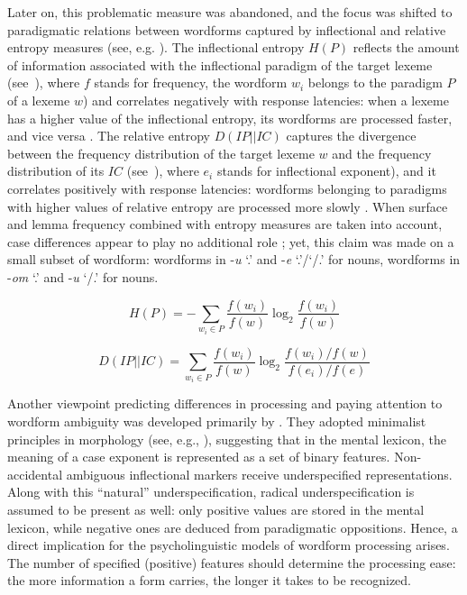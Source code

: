 \documentclass[output=paper, modfonts,newtxmath,hidelinks]{langscibook}
\begin{document}
Later on, this problematic measure was abandoned, and the focus was shifted to paradigmatic relations between wordforms captured by inflectional and relative entropy measures (see, e.g. \citealt{milin2009simultaneous}). The inflectional entropy $H(P)$ reflects the amount of information associated with the inflectional paradigm of the target lexeme (see~), where $f$ stands for frequency, the wordform $w_i$ belongs to the paradigm $P$ of a lexeme $w$) and correlates negatively with response latencies: when a lexeme has a higher value of the inflectional entropy, its wordforms are processed faster, and vice versa  \citep{del2004putting}. The relative entropy $D(IP||IC)$ captures the divergence between the frequency distribution of the target lexeme $w$ and the frequency distribution of its  $IC$ (see~), where $e_i$ stands for inflectional exponent), and it correlates positively with response latencies: wordforms belonging to paradigms with higher values of relative entropy are processed more slowly \citep{milin2009simultaneous}. When surface and lemma frequency combined with entropy measures are taken into account, case differences appear to play no additional role \citep{milin2009simultaneous}; yet, this claim was made on a small subset of wordform: wordforms in -\textit{u} `{\accc.\sg}’ and -\textit{e} ‘{\genn.\sg}’\slash ‘{\nomm/\accc.\pl}’ for  nouns, wordforms in -\textit{om} `{\ins.\sg}’ and -\textit{u} `{\datt/\locc.\sg}’ for  nouns.

	\ea\label{equation:inflEntropy}\begin{equation*}
		H(P) = -\sum_{w_i \in P} \frac{f(w_i)}{f(w)} \log _2\frac{f(w_i)}{f(w)}
        \end{equation*}
	\z

\ea\label{equation:relEntr}\begin{equation*}
		D(IP||IC) = \sum_{w_i \in P} \frac{f(w_i)}{f(w)} \log _2 \frac{f(w_i)/f(w)}{f(e_i)/f(e)}
        \end{equation*}
	\z

\noindent Another viewpoint predicting differences in  processing and paying attention to wordform ambiguity was developed primarily by \citet{clahsen2001mental}. They adopted minimalist principles in morphology (see, e.g., \citealt{wunderlich1996minimalist}), suggesting that in the mental lexicon, the meaning of a case exponent is represented as a set of binary features. Non-accidental ambiguous inflectional markers receive underspecified representations. Along with this ``natural'' underspecification, radical underspecification is assumed to be present as well: only positive values are stored in the mental lexicon, while negative ones are deduced from paradigmatic oppositions. Hence, a direct implication for the psycholinguistic models of wordform processing arises. The number of specified (positive) features should determine the processing ease: the more information a form carries, the longer it takes to be recognized.
\end{document}
